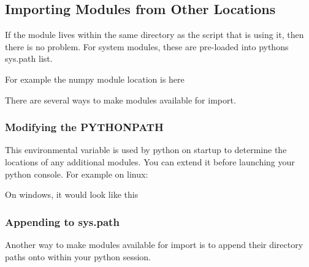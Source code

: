 \documentclass[letterpaper,10pt,english,openany]{sphinxmanual}
\begin{document}
\subsection{Importing Modules from Other Locations}
\label{\detokenize{introduction_to_python/using_modules:importing-modules-from-other-locations}}
If the module lives within the same directory as the script that is
using it, then there is no problem. For system modules, these are
pre-loaded into pythons sys.path list.

For example the numpy module location is here

\begin{sphinxVerbatim}[commandchars=\\\{\}]
 
\end{sphinxVerbatim}

There are several ways to make modules available for import.


\subsubsection{Modifying the PYTHONPATH}
\label{\detokenize{introduction_to_python/using_modules:modifying-the-pythonpath}}
This environmental variable is used by python on startup to determine
the locations of any additional modules. You can extend it before
launching your python console. For example on linux:

\begin{DUlineblock}{0em}
\item[] 
\item[] 
\end{DUlineblock}

On windows, it would look like this

\begin{DUlineblock}{0em}
\item[] 
\item[] 
\end{DUlineblock}


\subsubsection{Appending to sys.path}
\label{\detokenize{introduction_to_python/using_modules:appending-to-sys-path}}
Another way to make modules available for import is to append their
directory paths onto  within your python session.
\end{document}
